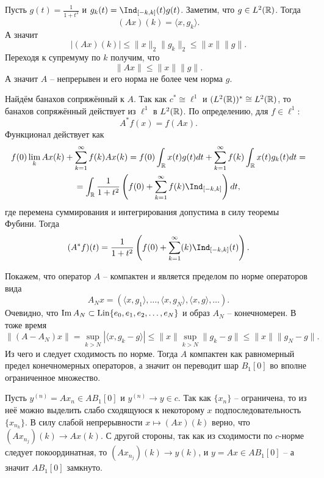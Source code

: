 \begin{solution}
    Пусть $g(t) = \frac{1}{1 + t^2}$ и $g_k(t) = \Ind_{[-k, k]}(t)g(t)$.
    Заметим, что $g \in L^2(\mathbb{R})$.
    Тогда
    \[
        (Ax)(k) = \langle x, g_k \rangle.
    \]
    А значит
    \[
        |(Ax)(k)| \leq \|x\|_2\|g_k\|_2 \leq \|x\|\|g\|.
    \]
    Переходя к супремуму по $k$ получим, что
    \[
        \|Ax\| \leq \|x\|\|g\|.
    \]
    А значит $A$ -- непрерывен и его норма не более чем норма $g$.

    Найдём банахов сопряжённый к $A$.
    Так как $c^* \cong \ell^1$ и $(L^2(\mathbb{R}))^* \cong L^2(\mathbb{R})$, то банахов сопряжённый действует из $\ell^1$ в $L^2(\mathbb{R})$.
    По определению, для $f \in \ell^1\colon$
    \[
        A^* f(x) = f(Ax).
    \]
    Функционал действует как
    \begin{multline*}
        f(0)\lim_{k}Ax(k) + \sum_{k = 1}^{\infty} f(k)Ax(k) = f(0) \int_{\R} x(t)g(t)dt + \sum_{k = 1}^{\infty} f(k) \int_{\R}x(t)g_k(t)dt = \\
        = \int_{\R} \frac{1}{1 + t^2}\left(f(0) + \sum_{k = 1}^{\infty}f(k)\Ind_{[-k, k]}\right)dt,
    \end{multline*}
    где перемена суммирования и интегрирования допустима в силу теоремы Фубини.
    Тогда
    \[
        (A^* f)(t) = \frac{1}{1 + t^2} \left(f(0) + \sum_{k = 1}^{\infty}(k)\Ind_{[-k, k]}(t)\right).
    \]

    Покажем, что оператор $A$ -- компактен и является пределом по норме операторов вида
    \[
        A_{N}x = \left(\langle x, g_1 \rangle, \ldots, \langle x, g_N \rangle, \langle x, g \rangle, \ldots   \right).
    \]
    Очевидно, что $\operatorname{Im} A_{N} \subset \operatorname{Lin}\{e_0, e_1, e_2, \ldots, e_N\}$ и образ $A_N$ -- конечномерен.
    В тоже время
    \[
        \|(A - A_N)x\| = \sup_{k > N} |\langle x, g_k - g \rangle| \leq \|x\|\sup_{k > N} \|g_k - g\| \leq \|x\|\|g_N - g\|.
    \]
    Из чего и следует сходимость по норме.
    Тогда $A$ компактен как равномерный предел конечномерных операторов, а значит он переводит шар $B_1[0]$ во вполне ограниченное множество.

    Пусть $y^{(n)} = Ax_n \in AB_1[0]$ и $y^{(n)} \rightarrow y \in c$.
    Так как $\{x_n\}$ -- ограничена, то из неё можно выделить слабо сходящуюся к некоторому $x$ подпоследовательность $\{x_{n_k}\}$.
    В силу слабой непрерывности $x \mapsto (Ax)(k)$ верно, что $(Ax_{n_j})(k) \rightarrow Ax(k)$.
    С другой стороны, так как из сходимости по $c$-норме следует покоординатная, то $(Ax_{n_j})(k) \rightarrow y(k)$, и $y = Ax \in AB_1[0]$ -- а значит $AB_1[0]$ замкнуто.
\end{solution}
